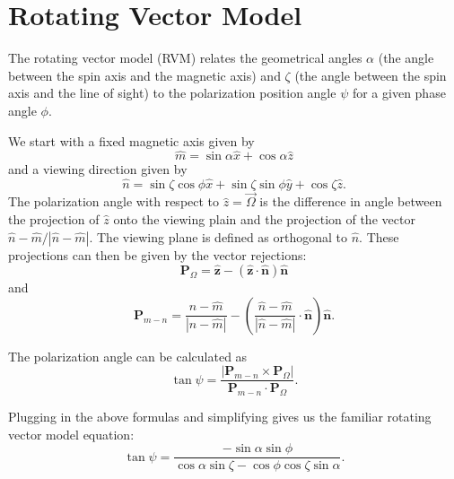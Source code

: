 \section{Rotating Vector Model}
\label{sec:RVMformula}

The rotating vector model (RVM) relates the 
geometrical angles $\alpha$ (the angle between
the spin axis and the magnetic axis) and $\zeta$ (the
angle between the spin axis and the line of sight)
to the polarization position angle $\psi$ for 
a given phase angle $\phi$.

We start with a fixed magnetic axis given by
\begin{equation}
\hat{m}=\sin{\alpha}\hat{x}+\cos{\alpha}\hat{z}
\end{equation}
and a viewing direction given by
\begin{equation}
\hat{n}=\sin{\zeta}\cos{\phi}\hat{x}+\sin{\zeta}\sin{\phi}\hat{y}+\cos{\zeta}\hat{z}.
\end{equation}
The polarization angle with respect to $\hat{z}=\vec{\Omega}$
is the difference in angle between the projection of $\hat{z}$
onto the viewing plain and the projection of the vector 
$\hat{n}-\hat{m}/|\hat{n}-\hat{m}|$.
The viewing plane is defined as orthogonal to $\hat{n}$.
These projections can then be given by the vector rejections:
\begin{equation}
\mathbf{P}_{\Omega}=\mathbf{\hat{z}}-(\mathbf{\hat{z}}\cdot\mathbf{\hat{n}})\mathbf{\hat{n}}
\end{equation}
and 
\begin{equation}
\mathbf{P}_{m-n}=\frac{\hat{n}-\hat{m}}{|\hat{n}-\hat{m}|}-\left(\frac{\hat{n}-\hat{m}}{|\hat{n}-\hat{m}|}\cdot\mathbf{\hat{n}}\right)\mathbf{\hat{n}}
.\end{equation}

The polarization angle can be calculated as
\begin{equation}
\tan{\psi}=\frac{|\mathbf{P}_{m-n}\times\mathbf{P}_{\Omega}|}{\mathbf{P}_{m-n}\cdot\mathbf{P}_{\Omega}}
.\end{equation}

Plugging in the above formulas and simplifying gives us the familiar 
rotating vector model equation:
\begin{equation}
\tan{\psi}=\frac{
-\sin{\alpha}\sin{\phi}
}{
\cos{\alpha}\sin{\zeta}-\cos{\phi}\cos{\zeta}\sin{\alpha}
}
.\end{equation}
